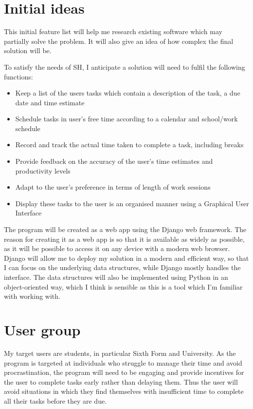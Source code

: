 \documentclass{article}
\begin{document}
\section{Initial ideas}
This initial feature list will help me research existing software which may
partially solve the problem. It will also give an idea of how complex the final
solution will be.

To satisfy the needs of SH, I anticipate a solution will need to fulfil the
following functions:

\begin{samepage}
	\begin{itemize}
		\item Keep a list of the users tasks which contain a description of the task, a
		      due date and time estimate
		\item Schedule tasks in user's free time according to a calendar and school/work
		      schedule
		\item Record and track the actual time taken to complete a task, including
		      breaks
		\item Provide feedback on the accuracy of the user's time estimates and
		      productivity levels
		\item Adapt to the user's preference in terms of length of work sessions
		\item Display these tasks to the user is an organised manner using a Graphical
		      User Interface
	\end{itemize}
\end{samepage}

The program will be created as a web app using the Django web framework. The
reason for creating it as a web app is so that it is available as widely as
possible, as it will be possible to access it on any device with a modern web
browser. Django will allow me to deploy my solution in a modern and efficient
way, so that I can focus on the underlying data structures, while Django mostly
handles the interface. The data structures will also be implemented using Python
in an object-oriented way, which I think is sensible as this is a tool which I'm familiar
with working with.

\section{User group}
My target users are students, in particular Sixth Form and University. As the
program is targeted at individuals who struggle to manage their time and avoid
procrastination, the program will need to be engaging and provide incentives for
the user to complete tasks early rather than delaying them. Thus the user will
avoid situations in which they find themselves with insufficient time to
complete all their tasks before they are due.
\end{document}
